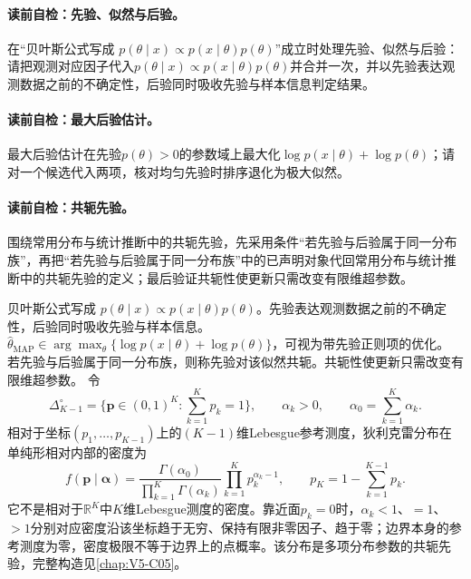 \paragraph{读前自检：先验、似然与后验。}在“贝叶斯公式写成 $p(\theta\mid x)\propto p(x\mid\theta)p(\theta)$”成立时处理先验、似然与后验：请把观测对应因子代入$p(\theta\mid x)\propto p(x\mid\theta)p(\theta)$并合并一次，并以先验表达观测数据之前的不确定性，后验同时吸收先验与样本信息判定结果。\par
\paragraph{读前自检：最大后验估计。}最大后验估计在先验$p(\theta)>0$的参数域上最大化$\log p(x\mid\theta)+\log p(\theta)$；请对一个候选代入两项，核对均匀先验时排序退化为极大似然。\par
\paragraph{读前自检：共轭先验。}围绕常用分布与统计推断中的共轭先验，先采用条件“若先验与后验属于同一分布族”，再把“若先验与后验属于同一分布族”中的已声明对象代回常用分布与统计推断中的共轭先验的定义；最后验证共轭性使更新只需改变有限维超参数。\par

贝叶斯公式写成 $p(\theta\mid x)\propto p(x\mid\theta)p(\theta)$。先验表达观测数据之前的不确定性，后验同时吸收先验与样本信息。
$\hat\theta_{\mathrm{MAP}}\in\arg\max_\theta\{\log p(x\mid\theta)+\log p(\theta)\}$，可视为带先验正则项的优化。
若先验与后验属于同一分布族，则称先验对该似然共轭。共轭性使更新只需改变有限维超参数。
令
\[
\Delta_{K-1}^{\circ}
=\{\boldsymbol p\in(0,1)^K:\textstyle\sum_{k=1}^Kp_k=1\},
\qquad \alpha_k>0,
\qquad \alpha_0=\sum_{k=1}^K\alpha_k.
\]
相对于坐标$(p_1,\ldots,p_{K-1})$上的$(K-1)$维Lebesgue参考测度，狄利克雷分布在单纯形相对内部的密度为
\[
f(\boldsymbol p\mid\boldsymbol\alpha)
=\frac{\Gamma(\alpha_0)}{\prod_{k=1}^K\Gamma(\alpha_k)}
\prod_{k=1}^Kp_k^{\alpha_k-1},
\qquad
p_K=1-\sum_{k=1}^{K-1}p_k.
\]
它不是相对于$\mathbb R^K$中$K$维Lebesgue测度的密度。靠近面$p_k=0$时，$\alpha_k<1$、$=1$、$>1$分别对应密度沿该坐标趋于无穷、保持有限非零因子、趋于零；边界本身的参考测度为零，密度极限不等于边界上的点概率。该分布是多项分布参数的共轭先验，完整构造见\cref{chap:V5-C05}。


